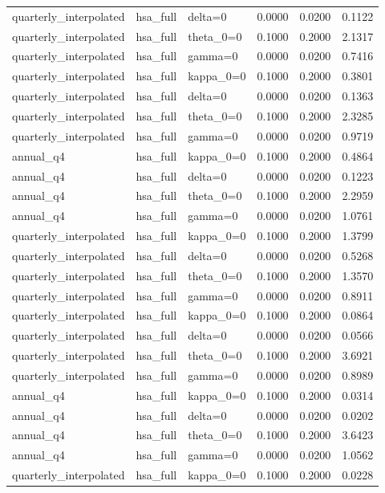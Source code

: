 \begin{tabular}{lllrrr}
quarterly\_interpolated & hsa\_full & delta=0 & 0.0000 & 0.0200 & 0.1122 \\
quarterly\_interpolated & hsa\_full & theta\_0=0 & 0.1000 & 0.2000 & 2.1317 \\
quarterly\_interpolated & hsa\_full & gamma=0 & 0.0000 & 0.0200 & 0.7416 \\
quarterly\_interpolated & hsa\_full & kappa\_0=0 & 0.1000 & 0.2000 & 0.3801 \\
quarterly\_interpolated & hsa\_full & delta=0 & 0.0000 & 0.0200 & 0.1363 \\
quarterly\_interpolated & hsa\_full & theta\_0=0 & 0.1000 & 0.2000 & 2.3285 \\
quarterly\_interpolated & hsa\_full & gamma=0 & 0.0000 & 0.0200 & 0.9719 \\
annual\_q4 & hsa\_full & kappa\_0=0 & 0.1000 & 0.2000 & 0.4864 \\
annual\_q4 & hsa\_full & delta=0 & 0.0000 & 0.0200 & 0.1223 \\
annual\_q4 & hsa\_full & theta\_0=0 & 0.1000 & 0.2000 & 2.2959 \\
annual\_q4 & hsa\_full & gamma=0 & 0.0000 & 0.0200 & 1.0761 \\
quarterly\_interpolated & hsa\_full & kappa\_0=0 & 0.1000 & 0.2000 & 1.3799 \\
quarterly\_interpolated & hsa\_full & delta=0 & 0.0000 & 0.0200 & 0.5268 \\
quarterly\_interpolated & hsa\_full & theta\_0=0 & 0.1000 & 0.2000 & 1.3570 \\
quarterly\_interpolated & hsa\_full & gamma=0 & 0.0000 & 0.0200 & 0.8911 \\
quarterly\_interpolated & hsa\_full & kappa\_0=0 & 0.1000 & 0.2000 & 0.0864 \\
quarterly\_interpolated & hsa\_full & delta=0 & 0.0000 & 0.0200 & 0.0566 \\
quarterly\_interpolated & hsa\_full & theta\_0=0 & 0.1000 & 0.2000 & 3.6921 \\
quarterly\_interpolated & hsa\_full & gamma=0 & 0.0000 & 0.0200 & 0.8989 \\
annual\_q4 & hsa\_full & kappa\_0=0 & 0.1000 & 0.2000 & 0.0314 \\
annual\_q4 & hsa\_full & delta=0 & 0.0000 & 0.0200 & 0.0202 \\
annual\_q4 & hsa\_full & theta\_0=0 & 0.1000 & 0.2000 & 3.6423 \\
annual\_q4 & hsa\_full & gamma=0 & 0.0000 & 0.0200 & 1.0562 \\
quarterly\_interpolated & hsa\_full & kappa\_0=0 & 0.1000 & 0.2000 & 0.0228 \\

\end{tabular}
